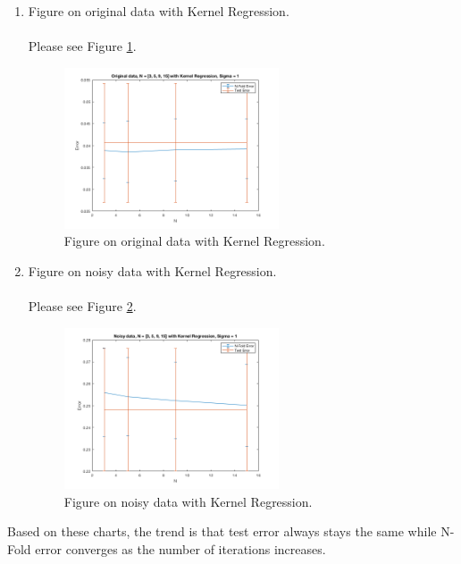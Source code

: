 \documentclass[english]{article}
\begin{document}
\begin{enumerate}[label=(\roman*)]
\begin{enumerate}
\begin{figure}[H]
        \end{figure}
        \item Figure on original data with Kernel Regression.\\ \\
        Please see Figure \ref{fig:213}. \\
        \begin{figure}[H]
          \centering
          \includegraphics[width=0.6\textwidth]{213.png}
          \caption{Figure on original data with Kernel Regression.}
          \label{fig:213}
        \end{figure}
        \item Figure on noisy data with Kernel Regression.\\ \\
        Please see Figure \ref{fig:214}. \\
        \begin{figure}[H]
          \centering
          \includegraphics[width=0.6\textwidth]{214.png}
          \caption{Figure on noisy data with Kernel Regression.}
          \label{fig:214}
        \end{figure}
    \end{enumerate}
    Based on these charts, the trend is that test error always stays the same while N-Fold error converges as the number of iterations increases.\\

\end{enumerate}
\end{document}
